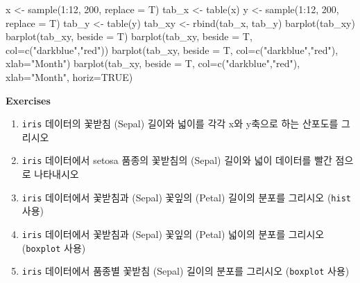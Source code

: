 \documentclass[
]{book}
\newenvironment{Shaded}{\begin{snugshade}}{\end{snugshade}}
\newcommand{\AttributeTok}[1]{\textcolor[rgb]{0.77,0.63,0.00}{#1}}
\newcommand{\ConstantTok}[1]{\textcolor[rgb]{0.00,0.00,0.00}{#1}}
\newcommand{\DecValTok}[1]{\textcolor[rgb]{0.00,0.00,0.81}{#1}}
\newcommand{\FunctionTok}[1]{\textcolor[rgb]{0.00,0.00,0.00}{#1}}
\newcommand{\NormalTok}[1]{#1}
\newcommand{\OtherTok}[1]{\textcolor[rgb]{0.56,0.35,0.01}{#1}}
\newcommand{\SpecialCharTok}[1]{\textcolor[rgb]{0.00,0.00,0.00}{#1}}
\newcommand{\StringTok}[1]{\textcolor[rgb]{0.31,0.60,0.02}{#1}}
\providecommand{\tightlist}{%
  \setlength{\itemsep}{0pt}\setlength{\parskip}{0pt}}
\begin{document}
\begin{Shaded}
\begin{Highlighting}[]
\NormalTok{x }\OtherTok{\textless{}{-}} \FunctionTok{sample}\NormalTok{(}\DecValTok{1}\SpecialCharTok{:}\DecValTok{12}\NormalTok{, }\DecValTok{200}\NormalTok{, }\AttributeTok{replace =}\NormalTok{ T)}
\NormalTok{tab\_x }\OtherTok{\textless{}{-}} \FunctionTok{table}\NormalTok{(x)}
\NormalTok{y }\OtherTok{\textless{}{-}} \FunctionTok{sample}\NormalTok{(}\DecValTok{1}\SpecialCharTok{:}\DecValTok{12}\NormalTok{, }\DecValTok{200}\NormalTok{, }\AttributeTok{replace =}\NormalTok{ T)}
\NormalTok{tab\_y }\OtherTok{\textless{}{-}} \FunctionTok{table}\NormalTok{(y)}
\NormalTok{tab\_xy }\OtherTok{\textless{}{-}} \FunctionTok{rbind}\NormalTok{(tab\_x, tab\_y)}
\FunctionTok{barplot}\NormalTok{(tab\_xy)}
\FunctionTok{barplot}\NormalTok{(tab\_xy, }\AttributeTok{beside =}\NormalTok{ T)}
\FunctionTok{barplot}\NormalTok{(tab\_xy, }\AttributeTok{beside =}\NormalTok{ T, }\AttributeTok{col=}\FunctionTok{c}\NormalTok{(}\StringTok{"darkblue"}\NormalTok{,}\StringTok{"red"}\NormalTok{))}
\FunctionTok{barplot}\NormalTok{(tab\_xy, }\AttributeTok{beside =}\NormalTok{ T, }\AttributeTok{col=}\FunctionTok{c}\NormalTok{(}\StringTok{"darkblue"}\NormalTok{,}\StringTok{"red"}\NormalTok{), }\AttributeTok{xlab=}\StringTok{"Month"}\NormalTok{)}
\FunctionTok{barplot}\NormalTok{(tab\_xy, }\AttributeTok{beside =}\NormalTok{ T, }\AttributeTok{col=}\FunctionTok{c}\NormalTok{(}\StringTok{"darkblue"}\NormalTok{,}\StringTok{"red"}\NormalTok{), }\AttributeTok{xlab=}\StringTok{"Month"}\NormalTok{, }\AttributeTok{horiz=}\ConstantTok{TRUE}\NormalTok{)}
\end{Highlighting}
\end{Shaded}

\textbf{Exercises}

\begin{enumerate}
\def\labelenumi{\arabic{enumi})}
\tightlist
\item
  \texttt{iris} 데이터의 꽃받침 (Sepal) 길이와 넓이를 각각 x와 y축으로 하는 산포도를 그리시오
\item
  \texttt{iris} 데이터에서 setosa 품종의 꽃받침의 (Sepal) 길이와 넓이 데이터를 빨간 점으로 나타내시오
\item
  \texttt{iris} 데이터에서 꽃받침과 (Sepal) 꽃잎의 (Petal) 길이의 분포를 그리시오 (\texttt{hist} 사용)
\item
  \texttt{iris} 데이터에서 꽃받침과 (Sepal) 꽃잎의 (Petal) 넓이의 분포를 그리시오 (\texttt{boxplot} 사용)
\item
  \texttt{iris} 데이터에서 품종별 꽃받침 (Sepal) 길이의 분포를 그리시오 (\texttt{boxplot} 사용)
\end{enumerate}
\end{document}

